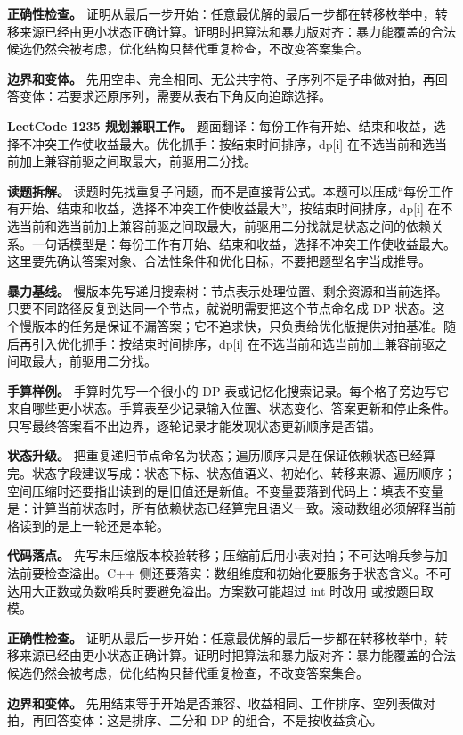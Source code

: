 \textbf{正确性检查。} 证明从最后一步开始：任意最优解的最后一步都在转移枚举中，转移来源已经由更小状态正确计算。证明时把算法和暴力版对齐：暴力能覆盖的合法候选仍然会被考虑，优化结构只替代重复检查，不改变答案集合。

\textbf{边界和变体。} 先用空串、完全相同、无公共字符、子序列不是子串做对拍，再回答变体：若要求还原序列，需要从表右下角反向追踪选择。

\noindent\textbf{LeetCode 1235 规划兼职工作。} 题面翻译：每份工作有开始、结束和收益，选择不冲突工作使收益最大。优化抓手：按结束时间排序，dp[i] 在不选当前和选当前加上兼容前驱之间取最大，前驱用二分找。

\textbf{读题拆解。} 读题时先找重复子问题，而不是直接背公式。本题可以压成“每份工作有开始、结束和收益，选择不冲突工作使收益最大”，按结束时间排序，dp[i] 在不选当前和选当前加上兼容前驱之间取最大，前驱用二分找就是状态之间的依赖关系。一句话模型是：每份工作有开始、结束和收益，选择不冲突工作使收益最大。这里要先确认答案对象、合法性条件和优化目标，不要把题型名字当成推导。

\textbf{暴力基线。} 慢版本先写递归搜索树：节点表示处理位置、剩余资源和当前选择。只要不同路径反复到达同一个节点，就说明需要把这个节点命名成 DP 状态。这个慢版本的任务是保证不漏答案；它不追求快，只负责给优化版提供对拍基准。随后再引入优化抓手：按结束时间排序，dp[i] 在不选当前和选当前加上兼容前驱之间取最大，前驱用二分找。

\textbf{手算样例。} 手算时先写一个很小的 DP 表或记忆化搜索记录。每个格子旁边写它来自哪些更小状态。手算表至少记录输入位置、状态变化、答案更新和停止条件。只写最终答案看不出边界，逐轮记录才能发现状态更新顺序是否错。

\textbf{状态升级。} 把重复递归节点命名为状态；遍历顺序只是在保证依赖状态已经算完。状态字段建议写成：状态下标、状态值语义、初始化、转移来源、遍历顺序；空间压缩时还要指出读到的是旧值还是新值。不变量要落到代码上：填表不变量是：计算当前状态时，所有依赖状态已经算完且语义一致。滚动数组必须解释当前格读到的是上一轮还是本轮。

\textbf{代码落点。} 先写未压缩版本校验转移；压缩前后用小表对拍；不可达哨兵参与加法前要检查溢出。C++ 侧还要落实：数组维度和初始化要服务于状态含义。不可达用大正数或负数哨兵时要避免溢出。方案数可能超过 int 时改用  或按题目取模。

\textbf{正确性检查。} 证明从最后一步开始：任意最优解的最后一步都在转移枚举中，转移来源已经由更小状态正确计算。证明时把算法和暴力版对齐：暴力能覆盖的合法候选仍然会被考虑，优化结构只替代重复检查，不改变答案集合。

\textbf{边界和变体。} 先用结束等于开始是否兼容、收益相同、工作排序、空列表做对拍，再回答变体：这是排序、二分和 DP 的组合，不是按收益贪心。

